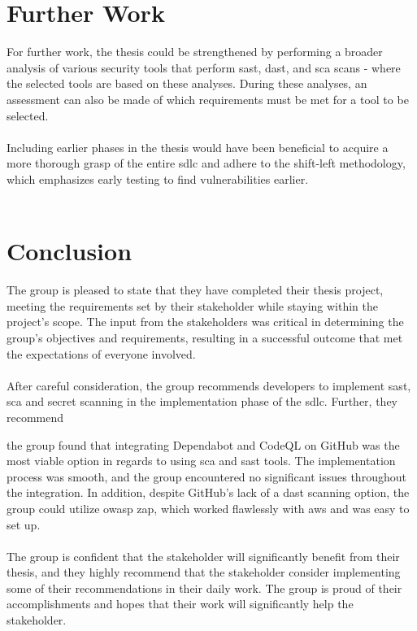 \section{Further Work}
For further work, the thesis could be strengthened by performing a broader analysis of various security tools that perform \acrshort{sast}, \acrshort{dast}, and \acrshort{sca} scans -  where the selected tools are based on these analyses. During these analyses, an assessment can also be made of which requirements must be met for a tool to be selected. 
\\~\\
Including earlier phases in the thesis would have been beneficial to acquire a more thorough grasp of the entire \acrlong{sdlc} and adhere to the shift-left methodology, which emphasizes early testing to find vulnerabilities earlier.   
\\~\\


\section{Conclusion}
The group is pleased to state that they have completed their thesis project, meeting the requirements set by their stakeholder while staying within the project's scope. The input from the stakeholders was critical in determining the group's objectives and requirements, resulting in a successful outcome that met the expectations of everyone involved.
\\~\\
After careful consideration, the group recommends developers to implement \acrshort{sast}, \acrshort{sca} and secret scanning in the implementation phase of the \acrshort{sdlc}. Further, they recommend 



the group found that integrating Dependabot and CodeQL on GitHub was the most viable option in regards to using \acrshort{sca} and \acrshort{sast} tools. The implementation process was smooth, and the group encountered no significant issues throughout the integration. In addition, despite GitHub's lack of a \acrshort{dast} scanning option, the group could utilize \acrshort{owasp} \acrshort{zap}, which worked flawlessly with \acrshort{aws} and was easy to set up.
\\~\\
The group is confident that the stakeholder will significantly benefit from their thesis, and they highly recommend that the stakeholder consider implementing some of their recommendations in their daily work. The group is proud of their accomplishments and hopes that their work will significantly help the stakeholder.
